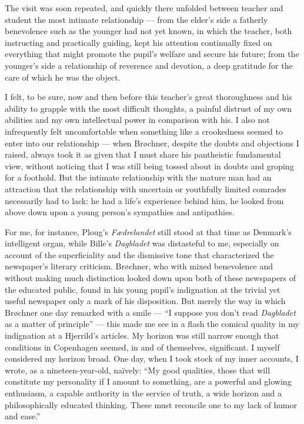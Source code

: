 \documentclass[12pt,a4paper]{article}
\newcommand{\pnum}[1]{\noindent\makebox[0pt][r]{\small\textit{[#1]}\quad}}
\begin{document}
The visit was soon repeated, and quickly there unfolded between teacher
and student the most intimate relationship --- from the elder's side a
fatherly benevolence such as the younger had not yet known, in which
the teacher, both instructing and practically guiding, kept his
attention continually fixed on everything that might promote the
pupil's welfare and secure his future; from the younger's side a
relationship of reverence and devotion, a deep gratitude for the care
of which he was the object.

I felt, to be sure, now and then before this teacher's great
\pnum{131}thoroughness and his ability to grapple with the most
difficult thoughts, a painful distrust of my own abilities and my own
intellectual power in comparison with his. I also not infrequently
felt uncomfortable when something like a crookedness seemed to enter
into our relationship --- when Brøchner, despite the doubts and
objections I raised, always took it as given that I must share his
pantheistic fundamental view, without noticing that I was still being
tossed about in doubts and groping for a foothold. But the intimate
relationship with the mature man had an attraction that the relationship
with uncertain or youthfully limited comrades necessarily had to lack:
he had a life's experience behind him, he looked from above down upon a
young person's sympathies and antipathies.

For me, for instance, Ploug's \textit{Fædrelandet} still stood at
that time as Denmark's intelligent organ, while Bille's
\textit{Dagbladet} was distasteful to me, especially on account of the
superficiality and the dismissive tone that characterized the
newspaper's literary criticism. Brøchner, who with mixed benevolence
and without making much distinction looked down upon both of these
newspapers of the educated public, found in his young pupil's
indignation at the trivial yet useful newspaper only a mark of his
disposition. But merely the way in which Brøchner one day remarked with
a smile --- ``I suppose you don't read \textit{Dagbladet} as a matter
of principle'' --- this made me see in a flash the comical quality in
my indignation at a Hjerrild's articles. My horizon was still narrow
enough that conditions in Copenhagen seemed, in and of themselves,
significant. I myself considered my horizon broad. One day, when I took
stock of my inner accounts, I wrote, as a nineteen-year-old, naïvely:
``My good qualities, those that will constitute my personality if I
amount to something, are a powerful and glowing enthusiasm, a capable
authority in the service of truth, a wide \pnum{132}horizon and a
philosophically educated thinking. These must reconcile one to my lack
of humor and ease.''
\end{document}
